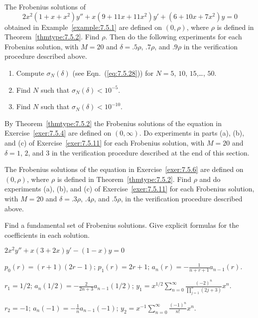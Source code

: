 \documentclass{ximera}
\begin{document}
\begin{problem}\label{exer:7.5.11}
The Frobenius solutions of
$$
2x^2(1+x+x^2)y''+x(9+11x+11x^2)y'+(6+10x+7x^2)y=0
$$
obtained in Example~\ref{example:7.5.1} are defined on $(0,\rho)$,
where $\rho$ is defined in Theorem~\ref{thmtype:7.5.2}. Find $\rho$.
Then do the following experiments for each Frobenius solution,
with $M=20$ and $\delta=.5\rho$, $.7\rho$, and $.9\rho$
in the verification procedure described above.
\begin{enumerate}
\item %
Compute  $\sigma_N(\delta)$  (see Eqn.~(\ref{eq:7.5.28}))
for $N=5$, $10$, $15$,\dots, $50$.
\item %
Find $N$ such that $\sigma_N(\delta)<10^{-5}$.
\item %
Find $N$ such that $\sigma_N(\delta)<10^{-10}$.
\end{enumerate}
\end{problem}


\begin{problem}\label{exer:7.5.12}
By Theorem~\ref{thmtype:7.5.2}
the Frobenius solutions of the equation in Exercise~\ref{exer:7.5.4} are
defined on $(0,\infty)$. Do experiments in parts (a), (b), and (c) of
Exercise~\ref{exer:7.5.11} for each Frobenius solution, with $M=20$ and
$\delta=1$, $2$, and $3$ in the verification procedure described at
the end of this section.
\end{problem}


\begin{problem}\label{exer:7.5.13}
The Frobenius solutions of the equation in Exercise~\ref{exer:7.5.6} are
defined on $(0,\rho)$, where $\rho$ is defined in
Theorem~\ref{thmtype:7.5.2}. Find $\rho$ and do experiments (a), (b), and (c) of Exercise~\ref{exer:7.5.11} for each Frobenius solution, with
$M=20$ and $\delta=.3\rho$, $.4\rho$, and $.5\rho$, in the verification
procedure described above.
\end{problem}


\begin{problem}\label{exer:7.5.14} 
Find a
fundamental set of Frobenius solutions. Give explicit formulas for the
coefficients in each solution.

$2x^2y''+x(3+2x)y'-(1-x)y=0$

\begin{solution}
    $p_0(r)=(r+1)(2r-1)$;
$p_1(r)=2r+1$;
$a_n(r)=-\frac{1}{ n+r+1}a_{n-1}(r)$.

$r_1=1/2$; $a_n(1/2)=-\frac{2}{ 2n+3}a_{n-1}(1/2)$;
$y_1=x^{1/2}\sum_{n=0}^\infty\frac{(-2)^n}{\prod_{j=1}^n(2j+3)}x^n$.

$r_2=-1$; $a_n(-1)=-\frac{1}{ n}a_{n-1}(-1)$;
$y_2=x^{-1}\sum_{n=0}^\infty\frac{(-1)^n}{ n!}x^n$.
\end{solution}
\end{problem}
\end{document}
